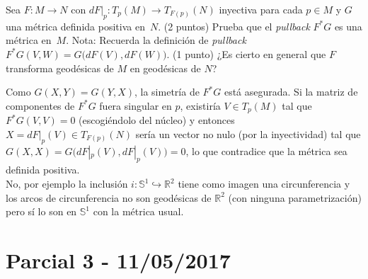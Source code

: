 \begin{problem}[3]Sea $F:M\longrightarrow N$ con $dF|_p:T_p(M)\longrightarrow T_{F(p)}(N)$ inyectiva para cada $p\in M$ y $G$ una métrica definida positiva en~$N$. 
	\ppart (2 puntos) Prueba que el \emph{pullback} $F^*G$ es una métrica en~$M$.
	{\sf Nota:} Recuerda la definición de \emph{pullback}  $F^*G(V,W)=G\big(dF(V), dF(W)\big)$.
	\ppart (1 punto) ¿Es cierto en general que $F$ transforma geodésicas de $M$ en geodésicas de $N$? 
	
	\solution 
	\spart Como $G(X,Y)=G(Y,X)$, la simetría de $F^*G$ está asegurada. Si la matriz de componentes de $F^*G$ fuera singular en $p$, existiría $V\in T_p(M)$ tal que $F^*G(V,V)=0$ (escogiéndolo del núcleo) y entonces $X=dF|_p(V)\in T_{F(p)}(N)$ sería un vector no nulo (por la inyectividad) tal que $G(X,X)=G\big(dF|_p(V), dF|_p(V)\big)=0$, lo que contradice que la métrica sea definida positiva.\\
	\spart No, por ejemplo la inclusión $i:\mathbb{S}^1\hookrightarrow\mathbb{R}^2$ tiene como imagen una circunferencia y los arcos de circunferencia no son geodésicas de $\mathbb{R}^2$ (con ninguna parametrización) pero sí lo son en $\mathbb{S}^1$ con la métrica usual. 
	
\end{problem}
\section{Parcial 3 - 11/05/2017}